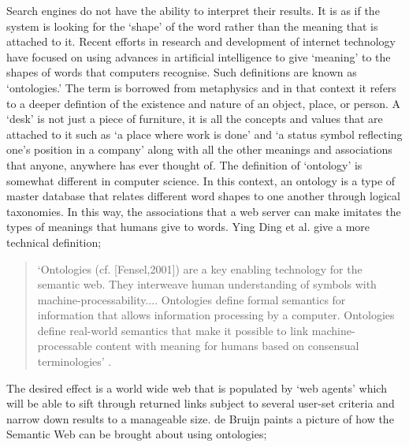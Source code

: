 \documentclass{ucthesis}
\begin{document}
Search engines do not have the ability to interpret their results. It is as
if the system is looking for the `shape' of the word rather than the meaning
that is attached to it. Recent efforts in research and development of
internet technology have focused on using advances in artificial
intelligence to give `meaning' to the shapes of words that computers
recognise. Such definitions are known as `ontologies.' The term is borrowed
from metaphysics and in that context it refers to a deeper defintion of the
existence and nature of an object, place, or person. A `desk' is not just a
piece of furniture, it is all the concepts and values that are attached to
it such as `a place where work is done' and `a status symbol reflecting
one's position in a company' along with all the other meanings and
associations that anyone, anywhere has ever thought of. The definition of
`ontology' is somewhat different in computer science. In this context, an
ontology is a type of master database that relates different word shapes to
one another through logical taxonomies. In this way, the associations that a
web server can make imitates the types of meanings that humans give to
words. Ying Ding et al. \cite[2004]{Ying Ding et al.} give a more technical
definition;

\begin{quotation}
`Ontologies (cf. [Fensel,2001]) are a key enabling technology for the
semantic web. They interweave human understanding of symbols with
machine-processability.... Ontologies define formal semantics for
information that allows information processing by a computer. Ontologies
define real-world semantics that make it possible to link
machine-processable content with meaning for humans based on consensual
terminologies' \cite[pp. 595]{Ying Ding et al.}.
\end{quotation}

The desired effect is a world wide web that is populated by `web agents'
which will be able to sift through returned links subject to several
user-set criteria and narrow down results to a manageable size. de Bruijn 
\cite[2003]{Jos 2003} paints a picture of how the Semantic Web can be
brought about using ontologies;
\end{document}
